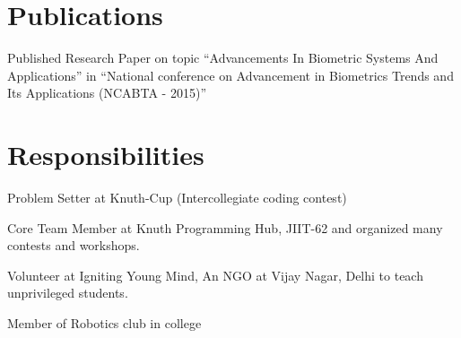 \documentclass[]{hieudo-build}
\begin{document}
\begin{minipage}[t]{0.69\textwidth} 







\section{Publications}

\descript{}
Published Research Paper on topic “Advancements In Biometric Systems And Applications” in “National conference on Advancement in Biometrics Trends and Its Applications (NCABTA - 2015)”	
\sectionsep


\section{Responsibilities}

\vspace{0.5em} %
\begin{tightemize}
\item Problem Setter at Knuth-Cup (Intercollegiate coding contest)
\item Core Team Member at Knuth Programming Hub, JIIT-62 and organized many contests and workshops.
\item Volunteer at Igniting Young Mind, An NGO at Vijay Nagar, Delhi to teach unprivileged students.
\item 	Member of Robotics club in college
\end{tightemize}
\sectionsep


\end{minipage}
\end{document}

